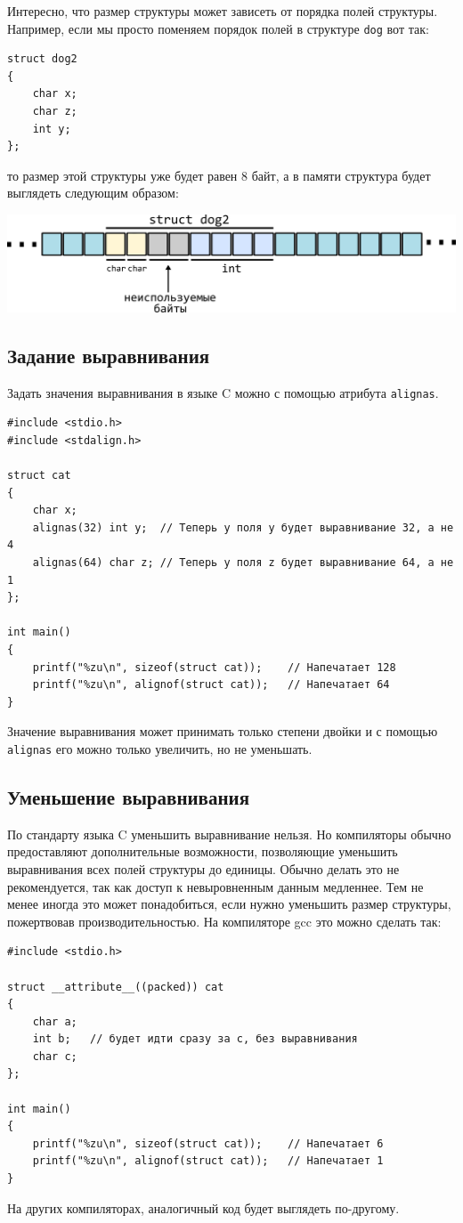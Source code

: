 \documentclass[10pt]{article}
\begin{document}
Интересно, что размер структуры может зависеть от порядка полей структуры. Например, если мы просто поменяем порядок полей в структуре \texttt{dog} вот так:
\begin{lstlisting}
struct dog2 
{
    char x;
    char z;
    int y;
};
\end{lstlisting}
то размер этой структуры уже будет равен 8 байт, а в памяти структура будет выглядеть следующим образом:
\begin{center}
\includegraphics[scale=1]{../images/alignment3.png}
\end{center}

\subsection*{Задание выравнивания}
Задать значения выравнивания в языке C можно с помощью атрибута \texttt{alignas}.
\begin{lstlisting}
#include <stdio.h>
#include <stdalign.h>

struct cat 
{
    char x;
    alignas(32) int y;	// Теперь у поля y будет выравнивание 32, а не 4
    alignas(64) char z;	// Теперь у поля z будет выравнивание 64, а не 1
};

int main() 
{
    printf("%zu\n", sizeof(struct cat));	// Напечатает 128
    printf("%zu\n", alignof(struct cat));	// Напечатает 64
}
\end{lstlisting}
Значение выравнивания может принимать только степени двойки и с помощью \texttt{alignas} его можно только увеличить, но не уменьшать.

\subsection*{Уменьшение выравнивания}
По стандарту языка C уменьшить выравнивание нельзя. Но компиляторы обычно предоставляют дополнительные возможности, позволяющие уменьшить выравнивания всех полей структуры до единицы. Обычно делать это не рекомендуется, так как доступ к невыровненным данным медленнее. Тем не менее иногда это может понадобиться, если нужно уменьшить размер структуры, пожертвовав производительностью. На компиляторе gcc это можно сделать так:

\begin{lstlisting}
#include <stdio.h>

struct __attribute__((packed)) cat 
{
    char a;
    int b;   // будет идти сразу за c, без выравнивания
    char c;
};

int main() 
{
    printf("%zu\n", sizeof(struct cat));	// Напечатает 6
    printf("%zu\n", alignof(struct cat));	// Напечатает 1
}
\end{lstlisting}
На других компиляторах, аналогичный код будет выглядеть по-другому.
\end{document}
